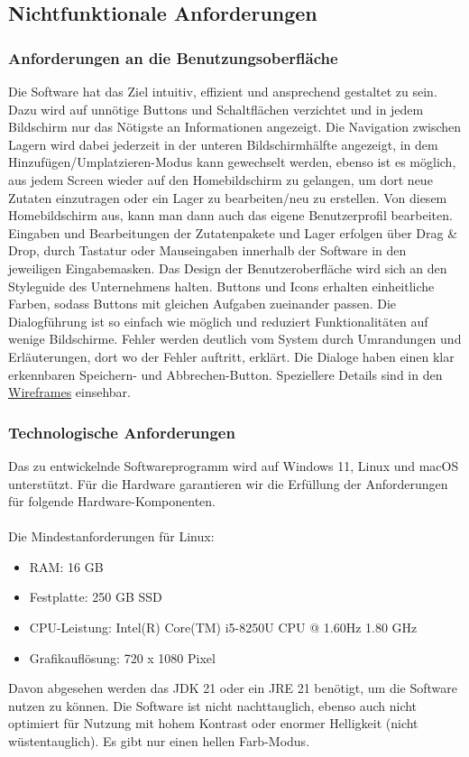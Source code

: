 \subsection{Nichtfunktionale Anforderungen}
\subsubsection{Anforderungen an die Benutzungsoberfläche}
Die Software hat das Ziel intuitiv, effizient und ansprechend gestaltet zu sein. Dazu wird auf unnötige Buttons
und Schaltflächen verzichtet und in jedem Bildschirm nur das Nötigste an Informationen angezeigt. Die Navigation
zwischen Lagern wird dabei jederzeit in der unteren Bildschirmhälfte angezeigt, in dem Hinzufügen/Umplatzieren-Modus
kann gewechselt werden, ebenso ist es möglich, aus jedem Screen wieder auf den Homebildschirm zu
gelangen, um dort neue Zutaten einzutragen oder ein Lager zu bearbeiten/neu zu erstellen. Von diesem Homebildschirm
aus, kann man dann auch das eigene Benutzerprofil bearbeiten. Eingaben und Bearbeitungen der Zutatenpakete und Lager
erfolgen über Drag \& Drop, durch Tastatur oder Mauseingaben innerhalb der Software in den jeweiligen Eingabemasken. Das
Design der Benutzeroberfläche wird sich an den Styleguide des Unternehmens halten. Buttons und Icons erhalten einheitliche
Farben, sodass Buttons mit gleichen Aufgaben zueinander passen. Die Dialogführung ist so einfach wie möglich und
reduziert Funktionalitäten auf wenige Bildschirme. Fehler werden deutlich vom System durch Umrandungen und Erläuterungen,
dort wo der Fehler auftritt, erklärt. Die Dialoge haben einen klar erkennbaren Speichern- und Abbrechen-Button. Speziellere
Details sind in den \hyperref[sec:wireframes]{Wireframes} einsehbar.
\subsubsection{Technologische Anforderungen}
Das zu entwickelnde Softwareprogramm wird auf Windows 11, Linux und macOS unterstützt. Für die Hardware garantieren wir die Erfüllung der Anforderungen für folgende Hardware-Komponenten.\\
\\
Die Mindestanforderungen für Linux:\\
\begin{itemize}
	\item RAM: 16 GB
	\item Festplatte: 250 GB SSD
	\item CPU-Leistung: Intel(R) Core(TM) i5-8250U CPU @ 1.60Hz 1.80 GHz
	\item Grafikauflösung: 720 x 1080 Pixel
\end{itemize}
Davon abgesehen werden das JDK 21 oder ein JRE 21 benötigt, um die Software
nutzen zu können. Die Software ist nicht nachttauglich, ebenso auch nicht optimiert für Nutzung mit
hohem Kontrast oder enormer Helligkeit (nicht wüstentauglich). Es gibt nur einen hellen Farb-Modus.

